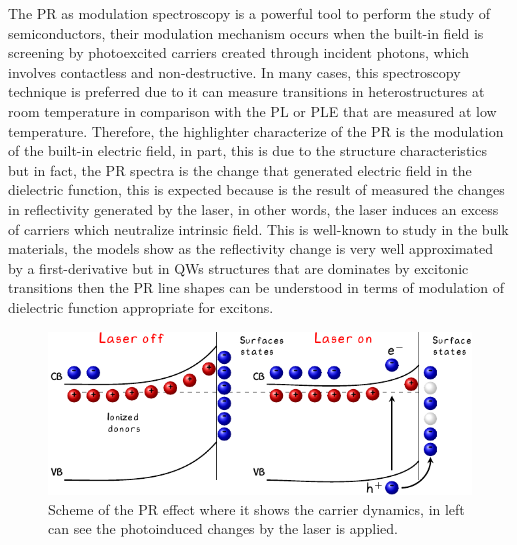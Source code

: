 The PR as modulation spectroscopy is a powerful tool to perform the study of semiconductors, their modulation mechanism occurs when the built-in field is screening by photoexcited carriers created through incident photons, which involves contactless and non-destructive.  In many cases, this spectroscopy technique is preferred due to it can measure transitions in heterostructures at room temperature in comparison with the PL or PLE\cite{shanabrook1987photoreflectance} that are measured at low temperature. Therefore, the highlighter characterize of the PR is the modulation of the built-in electric field, in part, this is due to the structure characteristics but in fact, the PR spectra is the change that generated electric field in the dielectric function, this is expected because is the result of measured the changes in reflectivity generated by the laser, in other words, the laser induces an excess of carriers which neutralize intrinsic field. This is well-known to study in the bulk materials, the models show as the reflectivity change is very well approximated by a first-derivative\cite{seraphin1972electric,aspnes1973surface,misiewicz1999photoreflectance,sydor1989photoreflectanceinterfaces}  but in QWs structures that are dominates by excitonic transitions then the PR line shapes can be understood in terms of modulation of dielectric function appropriate for excitons\cite{shanabrook1987photoreflectance,theis1988excitonic,theis1989extrinsic,gontijo1994photoreflectance}. 

\begin{figure}[ht!]
	\centering
	\includegraphics[width=\textwidth]{../figures/chapter-3/pr-modulation/build/pr-modulation.pdf}
	\caption{Scheme of the PR effect where it shows the carrier dynamics, in left can see the photoinduced changes by the laser is applied.}
	\label{fig:chapter-3-PR-MODULATION-MECHANISM}
\end{figure}

